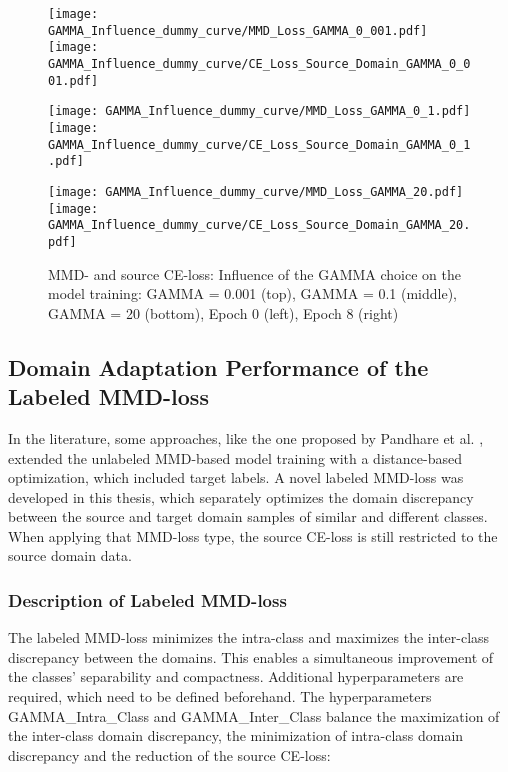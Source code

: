 \begin{figure}[H]
  \centering
  \texttt{[image: GAMMA\_Influence\_dummy\_curve/MMD\_Loss\_GAMMA\_0\_001.pdf]}
  \hspace{.3cm}
  \texttt{[image: GAMMA\_Influence\_dummy\_curve/CE\_Loss\_Source\_Domain\_GAMMA\_0\_001.pdf]}

  \vspace{.1cm}

  \texttt{[image: GAMMA\_Influence\_dummy\_curve/MMD\_Loss\_GAMMA\_0\_1.pdf]}
  \hspace{.3cm}
  \texttt{[image: GAMMA\_Influence\_dummy\_curve/CE\_Loss\_Source\_Domain\_GAMMA\_0\_1.pdf]}

  \vspace{.1cm}

  \texttt{[image: GAMMA\_Influence\_dummy\_curve/MMD\_Loss\_GAMMA\_20.pdf]}
  \hspace{.1cm}
  \texttt{[image: GAMMA\_Influence\_dummy\_curve/CE\_Loss\_Source\_Domain\_GAMMA\_20.pdf]}

  \caption{MMD- and source CE-loss: Influence of the GAMMA choice on the model training: GAMMA = 0.001 (top), GAMMA = 0.1 (middle), GAMMA = 20 (bottom), Epoch 0 (left), Epoch 8 (right)}
  \label{fig:learning_curves_influence_mmd_feature_extractor}
\end{figure}

\subsection{Domain Adaptation Performance of the Labeled MMD-loss} \label{sec:Differences of labeled and unlabeled MMD loss}

In the literature, some approaches, like the one proposed by Pandhare et al. \cite{Pandhare2021}, extended the unlabeled MMD-based model training with a distance-based optimization, which included target labels. A novel labeled MMD-loss was developed in this thesis, which separately optimizes the domain discrepancy between the source and target domain samples of similar and different classes. When applying that MMD-loss type, the source CE-loss is still restricted to the source domain data.
\subsubsection{Description of Labeled MMD-loss}
The labeled MMD-loss minimizes the intra-class and maximizes the inter-class discrepancy between the domains. This enables a simultaneous improvement of the classes' separability and compactness. Additional hyperparameters are required, which need to be defined beforehand. The hyperparameters GAMMA\_Intra\_Class and GAMMA\_Inter\_Class balance the maximization of the inter-class domain discrepancy, the minimization of intra-class domain discrepancy and the reduction of the source CE-loss:

